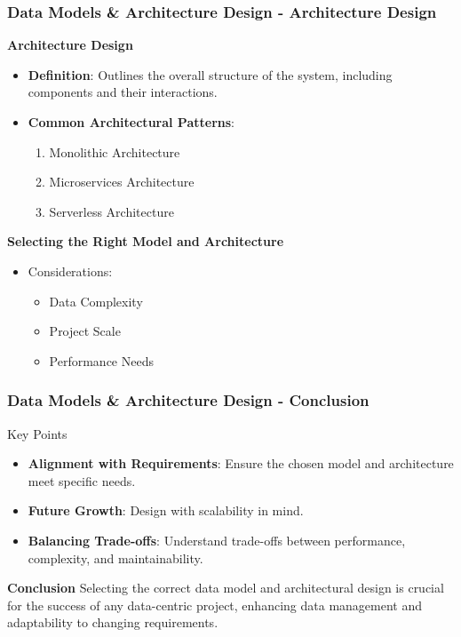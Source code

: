 \documentclass[aspectratio=169]{beamer}
\begin{document}
\begin{frame}[fragile]
    \frametitle{Data Models \& Architecture Design - Architecture Design}
    \textbf{Architecture Design}
    \begin{itemize}
        \item \textbf{Definition}: Outlines the overall structure of the system, including components and their interactions.
        \item \textbf{Common Architectural Patterns}:
            \begin{enumerate}
                \item Monolithic Architecture
                \item Microservices Architecture
                \item Serverless Architecture
            \end{enumerate}
    \end{itemize}
    \pause
    \textbf{Selecting the Right Model and Architecture}
    \begin{itemize}
        \item Considerations:
        \begin{itemize}
            \item Data Complexity
            \item Project Scale
            \item Performance Needs
        \end{itemize}
    \end{itemize}
\end{frame}

\begin{frame}[fragile]
    \frametitle{Data Models \& Architecture Design - Conclusion}
    \begin{block}{Key Points}
        \begin{itemize}
            \item \textbf{Alignment with Requirements}: Ensure the chosen model and architecture meet specific needs.
            \item \textbf{Future Growth}: Design with scalability in mind.
            \item \textbf{Balancing Trade-offs}: Understand trade-offs between performance, complexity, and maintainability.
        \end{itemize}
    \end{block}
    
    \textbf{Conclusion}
    Selecting the correct data model and architectural design is crucial for the success of any data-centric project, enhancing data management and adaptability to changing requirements.
\end{frame}
\end{document}
